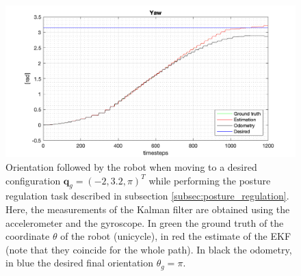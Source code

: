 \documentclass[a4paper]{article}
\begin{document}
\begin{figure}
    \centering
    \includegraphics[width=\textwidth]{images/yaw_postureregulation.png}
    \caption{Orientation followed by the robot when moving to a desired configuration
        $\bm{q}_g = (-2, 3.2, \pi)^T$ while performing the posture regulation task
        described in subsection \ref{subsec:posture_regulation}.
        Here, the measurements of the Kalman filter are obtained
        using the accelerometer and the gyroscope. In green the ground truth of the coordinate $\theta$ of the
        robot (unicycle), in red the estimate of the EKF (note that they coincide
        for the whole path). In black the odometry, in blue the desired final orientation $\theta_g = \pi$.}
    \label{fig:walk_to_desired_position_yaw}
\end{figure}
\end{document}
